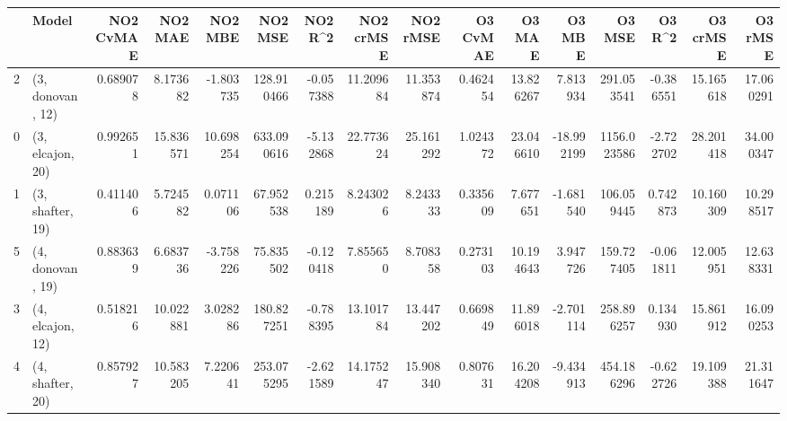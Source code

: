 \begin{tabular}{llrrrrrrrrrrrrrr}
\toprule
{} &             Model &  NO2 CvMAE &    NO2 MAE &    NO2 MBE &     NO2 MSE &   NO2 R\textasciicircum2 &  NO2 crMSE &   NO2 rMSE &  O3 CvMAE &     O3 MAE &     O3 MBE &       O3 MSE &    O3 R\textasciicircum2 &   O3 crMSE &    O3 rMSE \\
\midrule
2 &  (3, donovan, 12) &   0.689078 &   8.173682 &  -1.803735 &  128.910466 & -0.057388 &  11.209684 &  11.353874 &  0.462454 &  13.826267 &   7.813934 &   291.053541 & -0.386551 &  15.165618 &  17.060291 \\
0 &  (3, elcajon, 20) &   0.992651 &  15.836571 &  10.698254 &  633.090616 & -5.132868 &  22.773624 &  25.161292 &  1.024372 &  23.046610 & -18.992199 &  1156.023586 & -2.722702 &  28.201418 &  34.000347 \\
1 &  (3, shafter, 19) &   0.411406 &   5.724582 &   0.071106 &   67.952538 &  0.215189 &   8.243026 &   8.243333 &  0.335609 &   7.677651 &  -1.681540 &   106.059445 &  0.742873 &  10.160309 &  10.298517 \\
5 &  (4, donovan, 19) &   0.883639 &   6.683736 &  -3.758226 &   75.835502 & -0.120418 &   7.855650 &   8.708358 &  0.273103 &  10.194643 &   3.947726 &   159.727405 & -0.061811 &  12.005951 &  12.638331 \\
3 &  (4, elcajon, 12) &   0.518216 &  10.022881 &   3.028286 &  180.827251 & -0.788395 &  13.101784 &  13.447202 &  0.669849 &  11.896018 &  -2.701114 &   258.896257 &  0.134930 &  15.861912 &  16.090253 \\
4 &  (4, shafter, 20) &   0.857927 &  10.583205 &   7.220641 &  253.075295 & -2.621589 &  14.175247 &  15.908340 &  0.807631 &  16.204208 &  -9.434913 &   454.186296 & -0.622726 &  19.109388 &  21.311647 \\
\bottomrule
\end{tabular}
